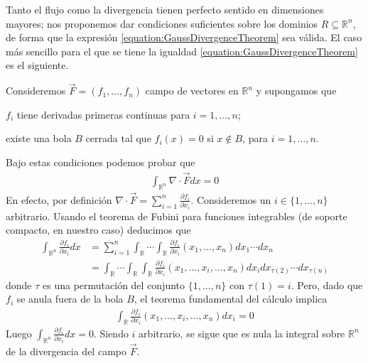 \documentclass{report}
\newcommand{\realNumbers}{\mathbb{R}}
\theoremstyle{remark}
\begin{document}
  Tanto el flujo como la divergencia tienen perfecto sentido en dimensiones mayores;
  nos proponemos dar condiciones suficientes sobre los dominios \(R \subseteq \realNumbers^n\), de forma que la expresión \eqref{equation:GaussDivergenceTheorem} sea válida.
  El caso más sencillo para el que se tiene la igualdad \eqref{equation:GaussDivergenceTheorem} es el siguiente.

  Consideremos \(\vec{F} = (f_1, \dots, f_n)\) campo de vectores en \(\realNumbers^n\) y supongamos que
  \begin{enumerate*}
    \item \(f_i\) tiene derivadas primeras continuas para \(i = 1, \dots, n\);
    \item existe una bola \(B\) cerrada tal que \(f_i(x) = 0\) si \(x \notin B\), para \(i = 1, \dots, n\).
  \end{enumerate*}
  Bajo estas condiciones podemos probar que 
  \begin{align}
    \label{equation:compactlySupportedFieldsHaveNullTotalDivergence}
    \int_{\realNumbers^n} \nabla \cdot \vec{F} dx = 0
  \end{align}
  En efecto, por definición
  \(
    \nabla \cdot \vec{F}
    =
    \sum_{i = 1}^n
    \frac{\partial f_i}{\partial x_i}
  \).
  Consideremos un \(i \in \{1, \dots, n\}\) arbitrario.
  Usando el teorema de Fubini para funciones integrables (de soporte compacto, en nuestro caso) deducimos que
  \begin{align}
    \int_{\realNumbers^n} \frac{\partial f_i}{\partial x_i} dx
    &=
    \sum_{i = 1}^n
    \int_{\realNumbers} \cdots \int_{\realNumbers}
      \frac{\partial f_i}{\partial x_i}(x_1, \dots, x_n)
    dx_1 \cdots dx_n
    \\
    \label{equation:integralsCanBePermutedBecauseOfCompactSupport}
    &=
    \int_{\realNumbers} \cdots \int_{\realNumbers} \int_{\realNumbers}
      \frac{\partial f_i}{\partial x_i}(x_1, \dots, x_i, \dots, x_n)
    dx_{i} dx_{\tau(2)} \cdots dx_{\tau(n)}
  \end{align}
  donde \(\tau\) es una permutación del conjunto \(\{1, \dots, n\}\) con \(\tau(1) = i\).
  Pero, dado que \(f_i\) se anula fuera de la bola \(B\), el teorema fundamental del cálculo implica
  \begin{align}
    \label{equation:integralIsNullBecauseOfCompactSupport}
    \int_{\realNumbers}
      \frac{\partial f_i}{\partial x_i}(x_1, \dots, x_i, \dots, x_n)
    dx_{i}
    =
    0
  \end{align}
  Luego \(\int_{\realNumbers^n} \frac{\partial f_i}{\partial x_i} dx = 0\).
  Siendo \(i\) arbitrario, se sigue que es nula la integral sobre \(\realNumbers^n\) de la divergencia del campo \(\vec{F}\).
  
\end{document}
